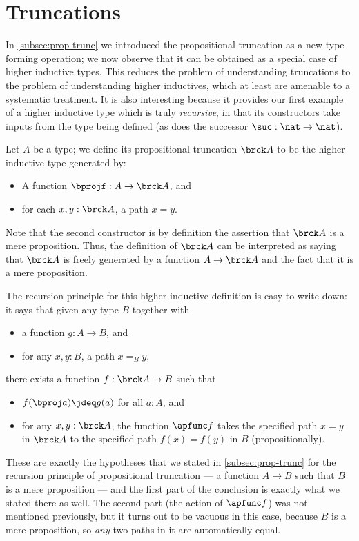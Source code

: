 \section{Truncations}
\label{sec:hittruncations}

%
In \cref{subsec:prop-trunc} we introduced the propositional truncation as a new type forming operation;
we now observe that it can be obtained as a special case of higher inductive types.
This reduces the problem of understanding truncations to the problem of understanding higher inductives, which at least are amenable to a systematic treatment.
It is also interesting because it provides our first example of a higher inductive type which is truly \emph{recursive}, in that its constructors take inputs from the type being defined (as does the successor $\suc:\nat\to\nat$).

Let $A$ be a type; we define its propositional truncation $\brck A$ to be the higher inductive type generated by:
\begin{itemize}
\item A function $\bprojf : A \to \brck A$, and
\item for each $x,y:\brck A$, a path $x=y$.
\end{itemize}
Note that the second constructor is by definition the assertion that $\brck A$ is a mere proposition.
Thus, the definition of $\brck A$ can be interpreted as saying that $\brck A$ is freely generated by a function $A\to\brck A$ and the fact that it is a mere proposition.

The recursion principle for this higher inductive definition is easy to write down: it says that given any type $B$ together with
\begin{itemize}
\item a function $g:A\to B$, and
\item for any $x,y:B$, a path $x=_B y$,
\end{itemize}
there exists a function $f:\brck A \to B$ such that
\begin{itemize}
\item $f(\bproj a) \jdeq g(a)$ for all $a:A$, and
\item for any $x,y:\brck A$, the function $\apfunc f$ takes the specified path $x=y$ in $\brck A$ to the specified path $f(x) = f(y)$ in $B$ (propositionally).
\end{itemize}
%
These are exactly the hypotheses that we stated in \cref{subsec:prop-trunc} for the recursion principle of propositional truncation --- a function $A\to B$ such that $B$ is a mere proposition --- and the first part of the conclusion is exactly what we stated there as well.
The second part (the action of $\apfunc f$) was not mentioned previously, but it turns out to be vacuous in this case, because $B$ is a mere proposition, so \emph{any} two paths in it are automatically equal.

